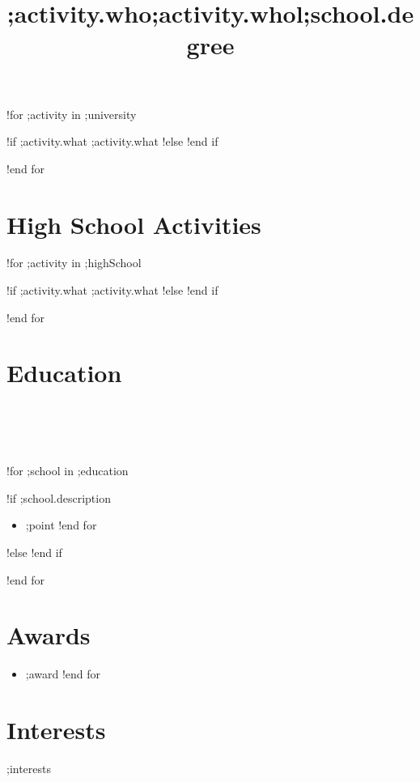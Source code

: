 \documentclass[margin,line]{res}
\begin{document}
\begin{sloppypar}
\begin{resume}
!for ;activity in ;university
    \title{\textbf{;activity.who}}
    \begin{position}
        !if ;activity.what
            ;activity.what
        !else
            \vspace{-0.5cm}
        !end if
    \end{position}
!end for


\section {High School Activities}

!for ;activity in ;highSchool
    \title{\textbf{;activity.who}}
    \begin{position}
        !if ;activity.what
            ;activity.what
        !else
            \vspace{-0.5cm}
        !end if
    \end{position}
!end for


\section{Education}

\begin{format}
  \title{l}\\
  \\
  \body\\
\end{format}

!for ;school in ;education
    \title{\textbf{;school.degree}}
    \begin{position}
        \vspace{-.3cm}
        !if ;school.description
            \begin{itemize}
            !for ;point in ;school.description
                \item ;point
            !end for
            \end{itemize}
        !else
            \vspace{-.2cm}
        !end if
    \end{position}
!end for


\section{Awards}
\begin{itemize}
    !for ;award in ;awards
        \item ;award
    !end for
\end{itemize}


\section{Interests}
;interests


\vfill

\end{resume}
\end{sloppypar}
\end{document}
